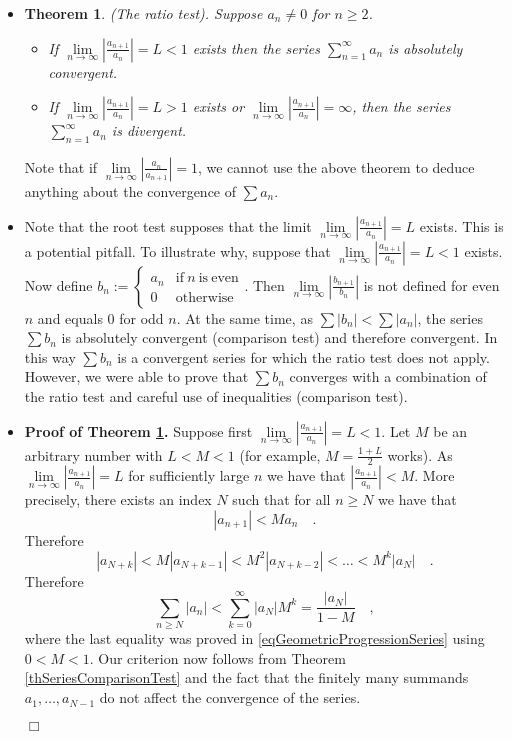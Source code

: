 \documentclass[12pt]{book}
\newenvironment{proof}[1][]{ \textbf{Proof#1.} }{$\Box$\medskip}
\newtheorem{theorem}{Theorem}[section]
\newcommand{\doublebrace}[4]{\left\{\begin{array}{ll} #1 & #2 \\#3 & #4  \end{array} \right.}
\begin{document}
\begin{itemize}
\item \begin{theorem}\label{thRatioTest}(The ratio test).  Suppose $a_n\neq 0$ for $n\geq 2$. 
\begin{itemize}
\item If $\lim\limits_{n\to\infty}\left|\frac{a_{n+1}}{a_{n}}\right|= L<1$ exists then the series $\sum\limits_{n=1}^\infty a_n$ is absolutely convergent.
\item If $\lim\limits_{n\to\infty}\left|\frac{a_{n+1}}{a_{n}}\right|= L>1$ exists or $\lim\limits_{n\to\infty} \left|\frac{a_{n+1}}{a_{n}}\right| =\infty$, then the series $\sum\limits_{n=1}^\infty a_n$ is divergent.
\end{itemize}
\end{theorem}
Note that if $\lim\limits_{n\to\infty}\left|\frac{a_n}{a_{n+1}}\right|=1$, we cannot use the above theorem to deduce anything about the convergence of $\sum a_n$.
\item Note that the root test supposes that the limit $\lim\limits_{n\to\infty} \left|\frac{a_{n+1}}{a_{n}}\right| =L$ exists. This is a potential pitfall. To illustrate why, suppose that $\lim\limits_{n\to\infty} \left|\frac{a_{n+1}}{a_{n}}\right| =L<1$ exists. Now define $b_n:=\doublebrace{a_n}{\mathrm{if~}n~\mathrm{is~even}}{0}{\mathrm{otherwise}}$. Then $\lim \limits_{n\to\infty} \left|\frac{b_{n+1}}{b_{n}}\right|$ is not defined for even $n$ and equals 0 for odd $n$. At the same time, as $\sum |b_n|<\sum |a_n|$, the series $\sum b_n$ is absolutely convergent (comparison test) and therefore convergent. In this way $\sum b_n$ is a convergent series for which the ratio test does not apply. However, we were able to prove that $\sum b_n$ converges with a combination of the ratio test and careful use of inequalities (comparison test).
\item \begin{proof}[ of Theorem \ref{thRatioTest}] 
Suppose first $\lim\limits_{n\to\infty}\left|\frac{a_{n+1}}{a_{n}}\right|= L<1 $. Let $M$ be an arbitrary number with $L<M<1$ (for example, $M=\frac{1+L}2$ works). As $\lim\limits_{n\to\infty}\left|\frac{a_{n+1}}{a_{n}}\right|=L$ for sufficiently large $n$ we have that $\left|\frac{a_{n+1}}{a_{n}} \right|< M$. More precisely, there exists an index $N$ such that for all $n\geq N$ we have that
\[
|a_{n+1}|< Ma_{n}\quad .
\]
Therefore 
\[
|a_{N+k}|<M |a_{N+k-1}|< M^2 |a_{N+k-2}|<\dots <M^k |a_N|\quad .
\]
Therefore 
\[
\sum_{n\geq N} |a_{n}|<\sum_{k=0}^{\infty} |a_N|M^{k}= \frac{|a_N|}{1-M}\quad ,
\] 
where the last equality was proved in \eqref{eqGeometricProgressionSeries} using $0<M<1$. Our criterion now follows from Theorem \ref{thSeriesComparisonTest} and the fact that the finitely many summands $a_1, \dots, a_{N-1}$ do not affect the convergence of the series.


\end{proof}
\end{itemize}
\end{document}
